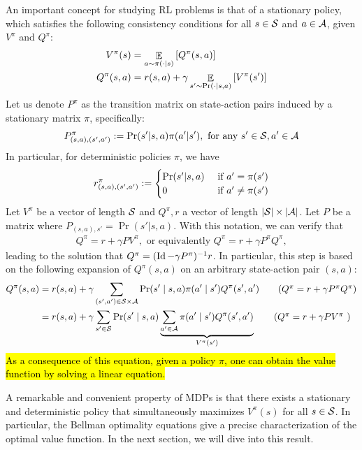 An important concept for studying RL problems is that of a stationary policy, which satisfies the following consistency conditions for all $s\in\mathcal{S}$ and $a\in\mathcal{A}$, given $V^{\pi}$ and $Q^{\pi}$:
\begin{align*}
    V^{\pi}(s) &= \mathop{\mathbb{E}}_{a \sim \pi(\cdot \mid s) }\left[ Q^{\pi}(s, a)  \right] \\
    Q^{\pi}(s, a) &= r(s, a) + \gamma \mathop{\mathbb{E}}_{s'\sim \Pr(\cdot | s, a)}\left[ V^{\pi}(s') \right]
\end{align*}
Let us denote $P^{\pi}$ as the transition matrix on state-action pairs induced by a stationary matrix $\pi$, specifically:
\[ P^{\pi}_{(s, a), (s', a')} := \Pr(s' | s, a) \pi(a' | s'), \text{ for any } s' \in \mathcal{S}, a' \in \mathcal{A} \]
In particular, for deterministic policies $\pi$, we have
\begin{align*}
    r^{\pi}_{(s, a), (s', a')} :=
    \begin{cases}
        \Pr(s' | s, a) & \text{ if } a' = \pi(s') \\
        0 & \text{ if } a' \neq \pi(s')
    \end{cases}
\end{align*}
Let $V^{\pi}$ be a vector of length $\mathcal{S}$ and $Q^{\pi}, r$ a vector of length $\left\lvert\mathcal{S}\right\rvert \times \left\lvert\mathcal{A}\right\rvert$.
Let $P$ be a matrix where $P_{(s, a), s'} = \Pr(s' | s, a)$.
With this notation, we can verify that
\begin{align*}
    Q^{\pi} = r + \gamma P V^{\pi}, \text{ or equivalently } Q^{\pi} = r + \gamma P^{\pi} Q^{\pi},
\end{align*}
leading to the solution that $Q^{\pi} = (\operatorname{Id} - \gamma P^{\pi})^{-1} r$. In particular, this step is based on the following expansion of $Q^{\pi}(s, a)$ on an arbitrary state-action pair $(s, a)$:
\begin{align*}
    Q^{\pi}(s, a) &= r(s, a) + \gamma \sum_{(s', a') \in \cS \times \cA} \Pr(s' \mid s, a) \pi(a' \mid s') Q^{\pi}(s', a')  \tag{$ Q^{\pi} = r + \gamma P^{\pi} Q^{\pi}$} \\
    &= r(s, a) + \gamma \sum_{s' \in \cS} \Pr(s' \mid s, a) \underbrace{ \sum_{a' \in \cA} \pi(a' \mid s') Q^{\pi}(s', a') }_{V^{\pi}(s')} \tag{$ Q^{\pi} = r + \gamma P V^{\pi}$ }
\end{align*}
\hl{As a consequence of this equation, given a policy $\pi$, one can obtain the value function by solving a linear equation.}

A remarkable and convenient property of MDPs is that there exists a stationary and deterministic policy that simultaneously maximizes $V^{\pi}(s)$ for all $s \in \mathcal{S}$.
In particular, the Bellman optimality equations \citep{bellman1956dynamic} give a precise characterization of the optimal value function. In the next section, we will dive into this result.

